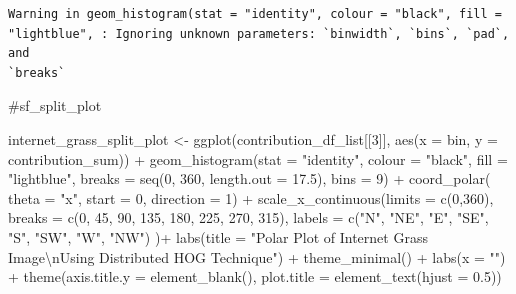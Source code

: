 \documentclass[
  letterpaper,
]{report}
\newenvironment{Shaded}{\begin{snugshade}}{\end{snugshade}}
\newcommand{\AttributeTok}[1]{\textcolor[rgb]{0.40,0.45,0.13}{#1}}
\newcommand{\CommentTok}[1]{\textcolor[rgb]{0.37,0.37,0.37}{#1}}
\newcommand{\DecValTok}[1]{\textcolor[rgb]{0.68,0.00,0.00}{#1}}
\newcommand{\FloatTok}[1]{\textcolor[rgb]{0.68,0.00,0.00}{#1}}
\newcommand{\FunctionTok}[1]{\textcolor[rgb]{0.28,0.35,0.67}{#1}}
\newcommand{\NormalTok}[1]{\textcolor[rgb]{0.00,0.23,0.31}{#1}}
\newcommand{\OtherTok}[1]{\textcolor[rgb]{0.00,0.23,0.31}{#1}}
\newcommand{\SpecialCharTok}[1]{\textcolor[rgb]{0.37,0.37,0.37}{#1}}
\newcommand{\StringTok}[1]{\textcolor[rgb]{0.13,0.47,0.30}{#1}}
\begin{document}
\begin{verbatim}
Warning in geom_histogram(stat = "identity", colour = "black", fill =
"lightblue", : Ignoring unknown parameters: `binwidth`, `bins`, `pad`, and
`breaks`
\end{verbatim}

\begin{Shaded}
\begin{Highlighting}[]
\CommentTok{\#sf\_split\_plot}
\end{Highlighting}
\end{Shaded}

\begin{Shaded}
\begin{Highlighting}[]
\NormalTok{internet\_grass\_split\_plot }\OtherTok{\textless{}{-}}
  \FunctionTok{ggplot}\NormalTok{(contribution\_df\_list[[}\DecValTok{3}\NormalTok{]], }
         \FunctionTok{aes}\NormalTok{(}\AttributeTok{x =}\NormalTok{ bin, }\AttributeTok{y =}\NormalTok{ contribution\_sum)) }\SpecialCharTok{+}
  \FunctionTok{geom\_histogram}\NormalTok{(}\AttributeTok{stat =} \StringTok{"identity"}\NormalTok{,}
                 \AttributeTok{colour =} \StringTok{"black"}\NormalTok{, }
                 \AttributeTok{fill =} \StringTok{"lightblue"}\NormalTok{, }
                 \AttributeTok{breaks =} \FunctionTok{seq}\NormalTok{(}\DecValTok{0}\NormalTok{, }\DecValTok{360}\NormalTok{, }\AttributeTok{length.out =} \FloatTok{17.5}\NormalTok{),}
                 \AttributeTok{bins =} \DecValTok{9}\NormalTok{) }\SpecialCharTok{+}
  \FunctionTok{coord\_polar}\NormalTok{(}
    \AttributeTok{theta =} \StringTok{"x"}\NormalTok{, }
    \AttributeTok{start =} \DecValTok{0}\NormalTok{, }
    \AttributeTok{direction =} \DecValTok{1}\NormalTok{) }\SpecialCharTok{+}
  \FunctionTok{scale\_x\_continuous}\NormalTok{(}\AttributeTok{limits =} \FunctionTok{c}\NormalTok{(}\DecValTok{0}\NormalTok{,}\DecValTok{360}\NormalTok{),}
    \AttributeTok{breaks =} \FunctionTok{c}\NormalTok{(}\DecValTok{0}\NormalTok{, }\DecValTok{45}\NormalTok{, }\DecValTok{90}\NormalTok{, }\DecValTok{135}\NormalTok{, }\DecValTok{180}\NormalTok{, }\DecValTok{225}\NormalTok{, }\DecValTok{270}\NormalTok{, }\DecValTok{315}\NormalTok{), }
    \AttributeTok{labels =} \FunctionTok{c}\NormalTok{(}\StringTok{"N"}\NormalTok{, }\StringTok{"NE"}\NormalTok{, }\StringTok{"E"}\NormalTok{, }\StringTok{"SE"}\NormalTok{, }\StringTok{"S"}\NormalTok{, }\StringTok{"SW"}\NormalTok{, }\StringTok{"W"}\NormalTok{, }\StringTok{"NW"}\NormalTok{)}
\NormalTok{  )}\SpecialCharTok{+}
  \FunctionTok{labs}\NormalTok{(}\AttributeTok{title =} \StringTok{"Polar Plot of Internet Grass Image}\SpecialCharTok{\textbackslash{}n}\StringTok{Using Distributed HOG Technique"}\NormalTok{) }\SpecialCharTok{+}
  \FunctionTok{theme\_minimal}\NormalTok{() }\SpecialCharTok{+}
  \FunctionTok{labs}\NormalTok{(}\AttributeTok{x =} \StringTok{""}\NormalTok{) }\SpecialCharTok{+}
  \FunctionTok{theme}\NormalTok{(}\AttributeTok{axis.title.y =} \FunctionTok{element\_blank}\NormalTok{(),}
        \AttributeTok{plot.title =} \FunctionTok{element\_text}\NormalTok{(}\AttributeTok{hjust =} \FloatTok{0.5}\NormalTok{))}
\end{Highlighting}
\end{Shaded}
\end{document}
